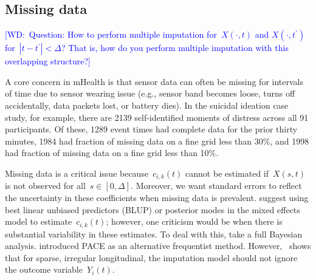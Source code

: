 \documentclass[11pt]{amsart}
\newcommand{\walt}[1]{\textcolor{blue}{[WD:\ #1]}}
\begin{document}
\subsection{Missing data}
\label{section:missingdata}
\walt{Question: How to perform multiple imputation for~$X(\cdot,t)$
  and $X(\cdot, t^\prime)$ for~$|t - t^\prime| <\Delta$? That is, how
  do you perform multiple imputation with this overlapping structure?}

A core concern in mHealth is that sensor data can often be missing for intervals of time due to sensor wearing issue (e.g., sensor band becomes loose, turns off accidentally, data packets lost, or battery dies). In the suicidal ideation case study, for example, there are 2139 self-identified moments of distress across all 91 participants. Of these, 1289 event times had complete data for the prior thirty minutes, 1984 had fraction of missing data on a fine grid less than 30\%, and 1998 had fraction of missing data on a fine grid less than 10\%.

Missing data is a critical issue because~$c_{i,k} (t)$ cannot be estimated if~$X(s,t)$ is not observed for all~$s \in [0,\Delta]$. Moreover, we want standard errors to reflect the uncertainty in these coefficients when missing data is prevalent. \cite{Goldsmith2011} suggest using best linear unbiased predictors (BLUP) or posterior modes in the mixed effects model to estimate~$c_{i,k} (t)$; however, one criticism would be when there is substantial variability in these estimates.  To deal with this, \cite{Crainiceanu2010} take a full Bayesian analysis. \cite{Yao2005} introduced PACE as an alternative frequentist method. However,~\cite{Petrovich2018} shows that for sparse, irregular longitudinal, the imputation model should not ignore the outcome variable~$Y_i (t)$.
\end{document}
